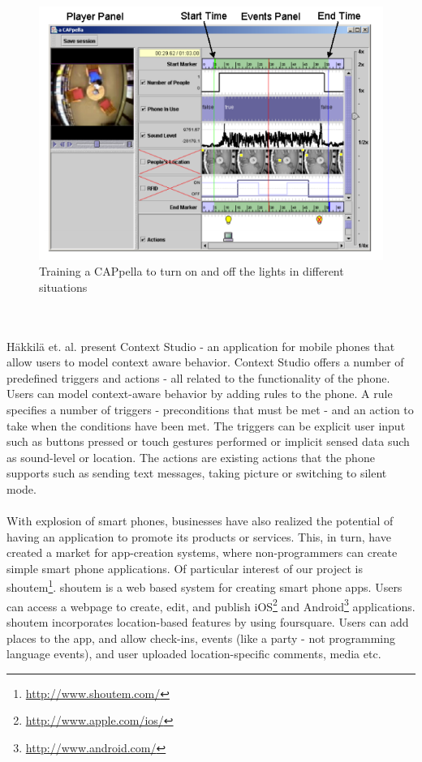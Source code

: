 \begin{figure}
	\centering
	\includegraphics[scale=0.4]{fig/acappella}
	\caption{Training a CAPpella \cite{Dey:2004:CPD:985692.985697} to turn on and off the lights in different situations}
	\label{fig:acappella}
\end{figure}
\\\\
\noindent Häkkilä et. al. present Context Studio \cite{springerlink:10.1007/11555261_73} - an application for mobile phones that allow users to model context aware behavior. Context Studio offers a number of predefined triggers and actions - all related to the functionality of the phone. Users can model context-aware behavior by adding rules to the phone. A rule specifies a number of triggers - preconditions that must be met - and an action to take when the conditions have been met. The triggers can be explicit user input such as buttons pressed or touch gestures performed or implicit sensed data such as sound-level or location. The actions are existing actions that the phone supports such as sending text messages, taking picture or switching to silent mode.
\\\\ 
With explosion of smart phones, businesses have also realized the potential of having an application to promote its products or services. This, in turn, have created a market for app-creation systems, where non-programmers can create simple smart phone applications. Of particular interest of our project is shoutem\footnote{\url{http://www.shoutem.com/}}. shoutem is a web based system for creating smart phone apps. Users can access a webpage to create, edit, and publish iOS\footnote{\url{http://www.apple.com/ios/}} and Android\footnote{\url{http://www.android.com/}} applications. shoutem incorporates location-based features by using foursquare. Users can add places to the app, and allow check-ins, events (like a party - not programming language events), and user uploaded location-specific comments, media etc. 
